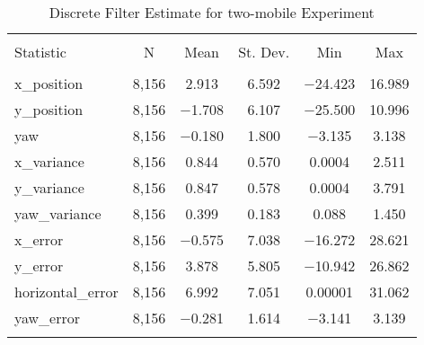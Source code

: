 
\begin{table}[h] \centering 
  \caption{Discrete Filter Estimate for two-mobile Experiment} 
  \label{tab:two_mobile_discrete_summary} 
\begin{tabular}{@{\extracolsep{5pt}}lccccc} 
\\[-1.8ex]\hline 
\hline \\[-1.8ex] 
Statistic & \multicolumn{1}{c}{N} & \multicolumn{1}{c}{Mean} & \multicolumn{1}{c}{St. Dev.} & \multicolumn{1}{c}{Min} & \multicolumn{1}{c}{Max} \\ 
\hline \\[-1.8ex] 
x\_position & 8,156 & 2.913 & 6.592 & $-$24.423 & 16.989 \\ 
y\_position & 8,156 & $-$1.708 & 6.107 & $-$25.500 & 10.996 \\ 
yaw & 8,156 & $-$0.180 & 1.800 & $-$3.135 & 3.138 \\ 
x\_variance & 8,156 & 0.844 & 0.570 & 0.0004 & 2.511 \\ 
y\_variance & 8,156 & 0.847 & 0.578 & 0.0004 & 3.791 \\ 
yaw\_variance & 8,156 & 0.399 & 0.183 & 0.088 & 1.450 \\ 
x\_error & 8,156 & $-$0.575 & 7.038 & $-$16.272 & 28.621 \\ 
y\_error & 8,156 & 3.878 & 5.805 & $-$10.942 & 26.862 \\ 
horizontal\_error & 8,156 & 6.992 & 7.051 & 0.00001 & 31.062 \\ 
yaw\_error & 8,156 & $-$0.281 & 1.614 & $-$3.141 & 3.139 \\ 
\hline \\[-1.8ex] 
\end{tabular} 
\end{table} 
